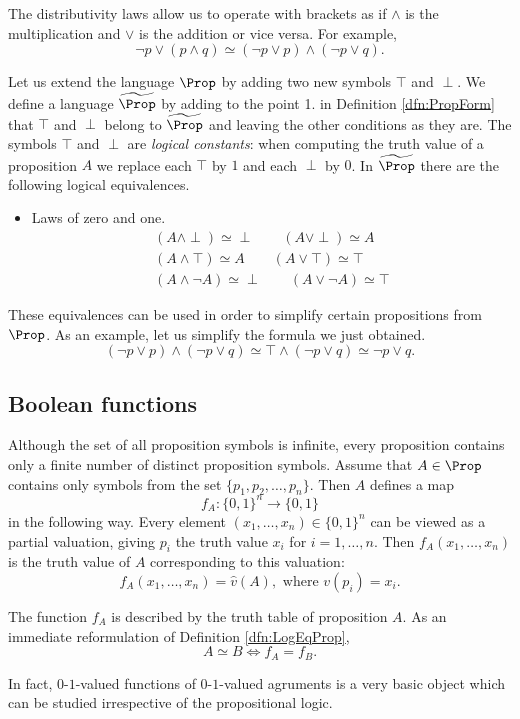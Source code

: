 \begin{page}
The distributivity laws allow us to operate with brackets as if $\wedge$ is the multiplication and $\vee$ is the addition
or vice versa.
For example,
\[
\neg p \vee (p \wedge q) \simeq (\neg p \vee p) \wedge (\neg p \vee q).
\]

Let us extend the language $\Prop$ by adding two new symbols $\top$ and $\perp$.
We define a language $\widetilde{\Prop}$ by adding to the point 1. in Definition \ref{dfn:PropForm} that $\top$ and $\perp$ belong to $\widetilde{\Prop}$
and leaving the other conditions as they are.
The symbols $\top$ and $\perp$ are \emph{logical constants}: when computing the truth value of a proposition $A$
we replace each $\top$ by $1$ and each $\perp$ by $0$.
In $\widetilde{\Prop}$ there are the following logical equivalences.
\begin{itemize}
\item
Laws of zero and one.
\begin{gather*}
(A \wedge \perp) \simeq \perp \qquad (A \vee \perp) \simeq A\\
(A \wedge \top) \simeq A \qquad (A \vee \top) \simeq \top\\
(A \wedge \neg A) \simeq \perp \qquad (A \vee \neg A) \simeq \top
\end{gather*}
\end{itemize}

These equivalences can be used in order to simplify certain propositions from $\Prop$.
As an example, let us simplify the formula we just obtained.
\[
(\neg p \vee p) \wedge (\neg p \vee q) \simeq \top \wedge (\neg p \vee q) \simeq \neg p \vee q.
\]




\end{page}

\begin{page}
\setcounter{section}{1}
\setcounter{subsection}{4}
\setcounter{dfn}{10}
\label{portion:440}

\subsection{Boolean functions}
Although the set of all proposition symbols is infinite,
every proposition contains only a finite number of distinct proposition symbols.
Assume that $A \in \Prop$ contains only symbols from the set $\{p_1, p_2, \ldots, p_n\}$.
Then $A$ defines a map
\[
f_A \colon \{0,1\}^n \to \{0,1\}
\]
in the following way.
Every element $(x_1, \ldots, x_n) \in \{0,1\}^n$ can be viewed as a partial valuation, giving $p_i$ the truth value $x_i$ for $i = 1, \ldots, n$.
Then $f_A(x_1, \ldots, x_n)$ is the truth value of $A$ corresponding to this valuation:
\[
f_A(x_1, \ldots, x_n) = \hat{v}(A), \text{ where } v(p_i) = x_i.
\]

The function $f_A$ is described by the truth table of proposition $A$.
As an immediate reformulation of Definition \ref{dfn:LogEqProp},
\[
A \simeq B \Leftrightarrow f_A = f_B.
\]

In fact, $0$-$1$-valued functions of $0$-$1$-valued agruments is a very basic object which can be studied irrespective of the propositional logic.

\end{page}


